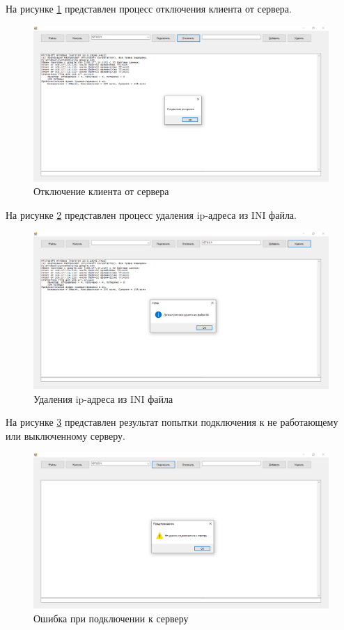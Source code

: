 На рисунке \ref{12:image} представлен процесс отключения клиента от сервера.

\begin{figure}
	\centering
	\includegraphics[width=1\linewidth]{"images/12"}
	\caption{Отключение клиента от сервера}
	\label{12:image}
\end{figure}

На рисунке \ref{13:image} представлен процесс удаления ip-адреса из INI файла.

\begin{figure}
	\centering
	\includegraphics[width=1\linewidth]{"images/13"}
	\caption{Удаления ip-адреса из INI файла}
	\label{13:image}
\end{figure}

На рисунке \ref{14:image} представлен результат попытки подключения к не работающему или выключенному серверу.

\begin{figure}
	\centering
	\includegraphics[width=1\linewidth]{"images/14"}
	\caption{Ошибка при подключении к серверу}
	\label{14:image}
\end{figure}

